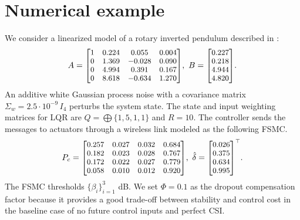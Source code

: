 \documentclass[letterpaper, 10 pt, conference]{ieeeconf}  %
\begin{document}
\section{Numerical example}\label{sec:example}
We consider a linearized model of a rotary inverted pendulum described in \cite{yZL-2025-automatica}:
\begin{equation*}%
A = \text{\footnotesize $
\begin{bmatrix}
1 & 0.224 & 0.055 & 0.004 \\
0 & 1.369 & -0.028 & 0.090 \\
0 & 4.994 & 0.391 & 0.167 \\
0 & 8.618 & -0.634 & 1.270
\end{bmatrix}$},~
B = \text{\footnotesize $
\begin{bmatrix}
0.227 \\
0.218 \\
4.944 \\
4.820 
\end{bmatrix}
$}.
\end{equation*}
An additive white Gaussian process noise with a covariance matrix $\Sigma_w \!=\! 2.5\cdot 10^{-9} \, I_{4}$ perturbs the system state. 
The state and input weighting matrices for LQR are $Q = \bigoplus\{1,5,1,1\}$ and $R = 10$.
The controller sends the messages to actuators through a wireless link modeled as the following FSMC.
\begin{equation*}%
P_c = \text{\footnotesize $
\begin{bmatrix}
0.257 & 0.027 & 0.032 & 0.684 \\
0.182 & 0.023 & 0.028 & 0.767 \\
0.172 & 0.022 & 0.027 & 0.779 \\
0.058 & 0.010 & 0.012 & 0.920
\end{bmatrix}$},~
\hat{\delta} = \text{\footnotesize $
\begin{bmatrix}
0.026 \\ 0.375 \\ 0.634 \\ 0.995
\end{bmatrix}^{\top}$}.
\end{equation*}
The FSMC thresholds $\{\beta_i\}_{i=1}^{3}$  dB.
We set $\mathit{\Phi}=0.1$ as the dropout compensation factor because it provides a good trade-off between stability and control cost in the baseline case of no future control inputs and perfect CSI.
\end{document}
